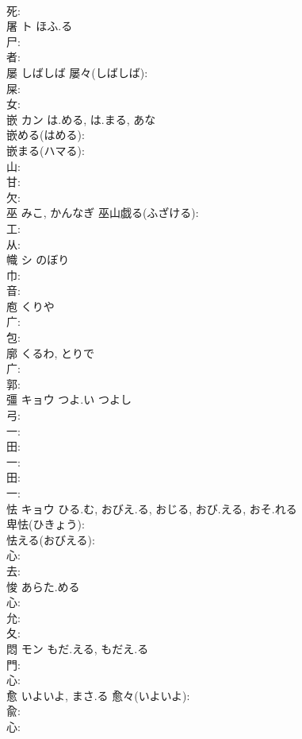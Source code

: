 \documentclass[8pt]{extreport}
\begin{document}
\begin{CJK}{UTF8}{min}
\\	死: 
\\	屠	ト	ほふ.る		
\\	尸: 
\\	者: 
\\	屡		しばしば			屡々(しばしば): 
\\	屎: 
\\	女: 
\\	嵌	カン	は.める, は.まる, あな		
\\	嵌める(はめる): 
\\	嵌まる(ハマる): 
\\	山: 
\\	甘: 
\\	欠: 
\\	巫		みこ, かんなぎ			巫山戯る(ふざける): 
\\	工: 
\\	从: 
\\	幟	シ	のぼり		
\\	巾: 
\\	音: 
\\	庖		くりや				
\\	广: 
\\	包: 
\\	廓		くるわ, とりで				
\\	广: 
\\	郭: 
\\	彊	キョウ	つよ.い	つよし	
\\	弓: 
\\	一: 
\\	田: 
\\	一: 
\\	田: 
\\	一: 
\\	怯	キョウ	ひる.む, おびえ.る, おじる, おび.える, おそ.れる		
\\	卑怯(ひきょう): 
\\	怯える(おびえる): 
\\	心: 
\\	去: 
\\	悛		あらた.める				
\\	心: 
\\	允: 
\\	夂: 
\\	悶	モン	もだ.える, もだえ.る		
\\	門: 
\\	心: 
\\	愈		いよいよ, まさ.る			愈々(いよいよ): 
\\	兪: 
\\	心: 

\end{CJK}
\end{document}
